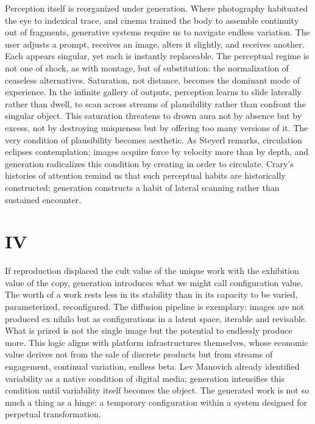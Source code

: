 \documentclass[12pt]{article}
\begin{document}
Perception itself is reorganized under generation. Where photography habituated the eye to indexical trace, and cinema trained the body to assemble continuity out of fragments, generative systems require us to navigate endless variation. The user adjusts a prompt, receives an image, alters it slightly, and receives another. Each appears singular, yet each is instantly replaceable. The perceptual regime is not one of shock, as with montage, but of substitution: the normalization of ceaseless alternatives. Saturation, not distance, becomes the dominant mode of experience. In the infinite gallery of outputs, perception learns to slide laterally rather than dwell, to scan across streams of plausibility rather than confront the singular object. This saturation threatens to drown aura not by absence but by excess, not by destroying uniqueness but by offering too many versions of it. The very condition of plausibility becomes aesthetic. As Steyerl remarks, circulation eclipses contemplation; images acquire force by velocity more than by depth,\autocite{Steyerl2013} and generation radicalizes this condition by creating in order to circulate. Crary’s histories of attention remind us that such perceptual habits are historically constructed; generation constructs a habit of lateral scanning rather than sustained encounter.\autocite{Crary1999}

\section*{IV}

If reproduction displaced the cult value of the unique work with the exhibition value of the copy, generation introduces what we might call configuration value. The worth of a work rests less in its stability than in its capacity to be varied, parameterized, reconfigured. The diffusion pipeline is exemplary: images are not produced ex nihilo but as configurations in a latent space, iterable and revisable. What is prized is not the single image but the potential to endlessly produce more. This logic aligns with platform infrastructures themselves, whose economic value derives not from the sale of discrete products but from streams of engagement, continual variation, endless beta. Lev Manovich already identified variability as a native condition of digital media; generation intensifies this condition until variability itself becomes the object.\autocite{Manovich2001} The generated work is not so much a thing as a hinge: a temporary configuration within a system designed for perpetual transformation.
\end{document}
